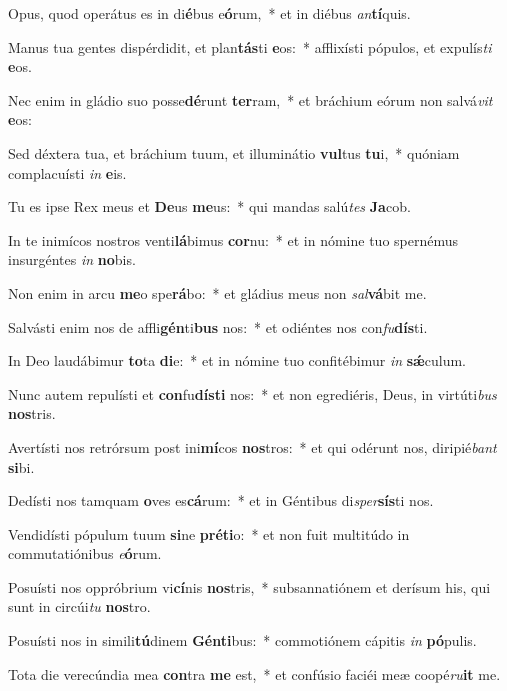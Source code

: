 \item Opus, quod operátus es in di\textbf{é}bus e\textbf{ó}rum,~* et in diébus \textit{an}\textbf{tí}quis.
\item Manus tua gentes dispérdidit, et plan\textbf{tás}ti \textbf{e}os:~* afflixísti pópulos, et expulís\textit{ti} \textbf{e}os.
\item Nec enim in gládio suo posse\textbf{dé}runt \textbf{ter}ram,~* et bráchium eórum non salvá\textit{vit} \textbf{e}os:
\item Sed déxtera tua, et bráchium tuum, et illuminátio \textbf{vul}tus \textbf{tu}i,~* quóniam complacuísti \textit{in} \textbf{e}is.
\item Tu es ipse Rex meus et \textbf{De}us \textbf{me}us:~* qui mandas salú\textit{tes} \textbf{Ja}cob.
\item In te inimícos nostros venti\textbf{lá}bimus \textbf{cor}nu:~* et in nómine tuo spernémus insurgéntes \textit{in} \textbf{no}bis.
\item Non enim in arcu \textbf{me}o spe\textbf{rá}bo:~* et gládius meus non \textit{sal}\textbf{vá}bit me.
\item Salvásti enim nos de affli\textbf{gén}ti\textbf{bus} nos:~* et odiéntes nos con\textit{fu}\textbf{dís}ti.
\item In Deo laudábimur \textbf{to}ta \textbf{di}e:~* et in nómine tuo confitébimur \textit{in} \textbf{sǽ}culum.
\item Nunc autem repulísti et \textbf{con}fu\textbf{dís}\textbf{ti} nos:~* et non egrediéris, Deus, in virtúti\textit{bus} \textbf{nos}tris.
\item Avertísti nos retrórsum post ini\textbf{mí}cos \textbf{nos}tros:~* et qui odérunt nos, diripié\textit{bant} \textbf{si}bi.
\item Dedísti nos tamquam \textbf{o}ves es\textbf{cá}rum:~* et in Géntibus di\textit{sper}\textbf{sís}ti nos.
\item Vendidísti pópulum tuum \textbf{si}ne \textbf{pré}\textbf{ti}o:~* et non fuit multitúdo in commutatiónibus \textit{e}\textbf{ó}rum.
\item Posuísti nos oppróbrium vi\textbf{cí}nis \textbf{nos}tris,~* subsannatiónem et derísum his, qui sunt in circúi\textit{tu} \textbf{nos}tro.
\item Posuísti nos in simili\textbf{tú}dinem \textbf{Gén}\textbf{ti}bus:~* commotiónem cápitis \textit{in} \textbf{pó}pulis.
\item Tota die verecúndia mea \textbf{con}tra \textbf{me} est,~* et confúsio faciéi meæ coopé\textit{ru}\textbf{it} me.
